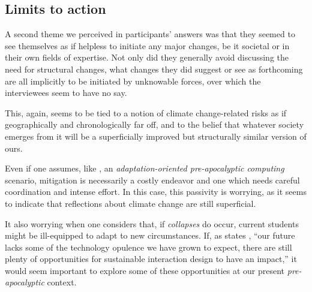 \subsection{Limits to action}

A second theme we perceived in participants' answers was that they seemed to see themselves as if helpless to initiate any major changes, be it societal or in their own fields of expertise. Not only did they generally avoid discussing the need for structural changes, what changes they did suggest or see as forthcoming are all implicitly to be initiated by unknowable forces, over which the interviewees seem to have no say.

This, again, seems to be tied to a notion of climate change-related risks as if geographically and chronologically far off, and to the belief that whatever society emerges from it will be a superficially improved but structurally similar version of ours.

Even if one assumes, like \citeauthor{easterbrook2010climate}, an \emph{adaptation-oriented pre-apocalyptic computing} scenario, mitigation is necessarily a costly endeavor and one which needs careful coordination and intense effort. In this case, this passivity is worrying, as it seems to indicate that reflections about climate change are still superficial.

It also worrying when one considers that, if \emph{collapses} do occur, current students might be ill-equipped to adapt to new circumstances. If, as states \citeauthor{wong2009prepare}, ``our future lacks some of the technology opulence we have grown to expect, there are still plenty of opportunities for sustainable interaction design to have an impact,'' it would seem important to explore some of these opportunities at our present \emph{pre-apocalyptic} context.